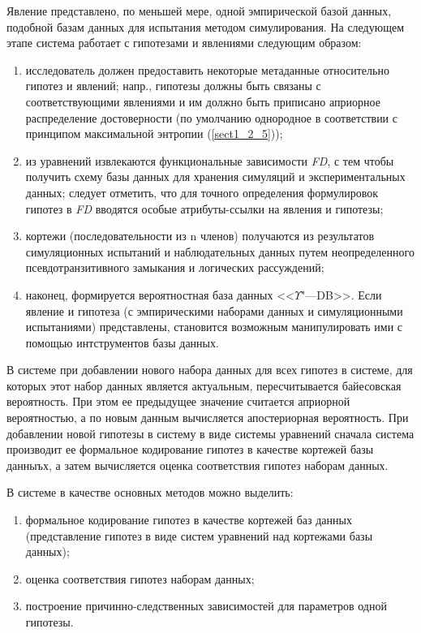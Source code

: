 Явление представлено, по меньшей мере, одной эмпирической базой данных, подобной базам данных для испытания методом 
симулирования. На следующем этапе система работает с гипотезами и явлениями следующим образом: 
\begin{enumerate}
    \item исследователь должен предоставить некоторые метаданные относительно гипотез и явлений; напр., гипотезы должны 
            быть связаны с соответствующими явлениями и им должно быть приписано априорное распределение достоверности 
            (по умолчанию однородное в соответствии с принципом максимальной энтропии (\cref{sect1_2_5}));
    \item из уравнений извлекаются функциональные зависимости \textit{FD}, с тем чтобы получить схему базы данных для 
            хранения симуляций и экспериментальных данных; следует отметить, что для точного определения формулировок 
            гипотез в \textit{FD} вводятся особые атрибуты-ссылки на явления и гипотезы; 
    \item кортежи (последовательности из n членов) получаются из результатов симуляционных испытаний и наблюдательных 
            данных путем неопределенного псевдотранзитивного замыкания и логических рассуждений;
    \item наконец, формируется вероятностная база данных <<$\Upsilon$"---DB>>. Если явление и гипотеза 
            (с эмпирическими наборами данных и симуляционными испытаниями) представлены, становится возможным 
            манипулировать ими с помощью интструментов базы данных.
\end{enumerate}

В системе при добавлении нового набора данных для всех гипотез в системе, для которых этот набор данных является 
актуальным, пересчитывается байесовская вероятность. При этом ее предыдущее значение считается априорной вероятностью, 
а по новым данным вычисляется апостериорная вероятность. При добавлении новой гипотезы в систему в виде системы 
уравнений сначала система производит ее формальное кодирование гипотез в качестве кортежей базы данныъх, а затем 
вычисляется оценка соответствия гипотез наборам данных.

В системе в качестве основных методов можно выделить:
\begin{enumerate}
    \item формальное кодирование гипотез в качестве кортежей баз данных (представление гипотез в виде систем 
            уравнений над кортежами базы данных);
    \item оценка соответствия гипотез наборам данных;
    \item построение причинно-следственных зависимостей для параметров одной гипотезы.
\end{enumerate}

